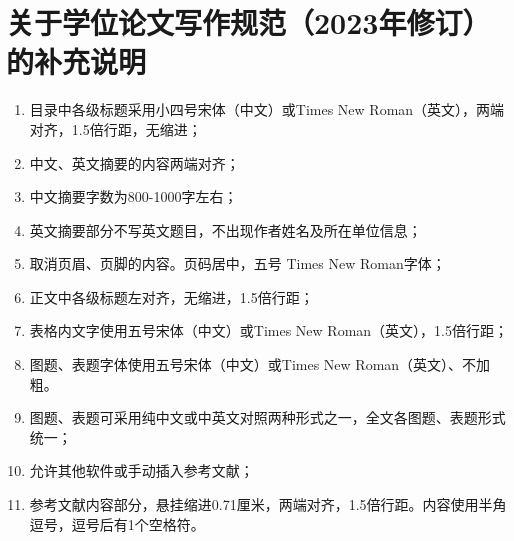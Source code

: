 \chapter[写作规范补充说明]{关于学位论文写作规范（2023年修订）的补充说明}

  \begin{enumerate}
      \item 目录中各级标题采用小四号宋体（中文）或Times New Roman（英文），两端对齐，1.5倍行距，无缩进；
      \item 中文、英文摘要的内容两端对齐；
      \item 中文摘要字数为800-1000字左右；
      \item 英文摘要部分不写英文题目，不出现作者姓名及所在单位信息；
      \item 取消页眉、页脚的内容。页码居中，五号 Times New Roman字体；
      \item 正文中各级标题左对齐，无缩进，1.5倍行距；
      \item 表格内文字使用五号宋体（中文）或Times New Roman（英文），1.5倍行距；
      \item 图题、表题字体使用五号宋体（中文）或Times New Roman（英文）、不加粗。
      \item 图题、表题可采用纯中文或中英文对照两种形式之一，全文各图题、表题形式统一；
      \item 允许其他软件或手动插入参考文献；
      \item 参考文献内容部分，悬挂缩进0.71厘米，两端对齐，1.5倍行距。内容使用半角逗号，逗号后有1个空格符。
  \end{enumerate}

  \vspace{1em}

    
